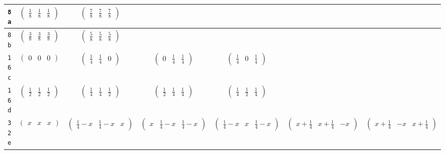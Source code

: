 \documentclass[fleqn,9pt,landscape]{jsarticle}
\begin{document}
\begin{center}
\begin{longtable}{ccccccc}
{\tt 8a} & $ \begin{pmatrix} \frac{1}{8} & \frac{1}{8} & \frac{1}{8} \end{pmatrix} $ & $ \begin{pmatrix} \frac{7}{8} & \frac{7}{8} & \frac{7}{8} \end{pmatrix} $ & $  $ & $  $ & $  $ & $  $ \\ \hline
{\tt 8b} & $ \begin{pmatrix} \frac{3}{8} & \frac{3}{8} & \frac{3}{8} \end{pmatrix} $ & $ \begin{pmatrix} \frac{5}{8} & \frac{5}{8} & \frac{5}{8} \end{pmatrix} $ & $  $ & $  $ & $  $ & $  $ \\ \hline
{\tt 16c} & $ \begin{pmatrix} 0 & 0 & 0 \end{pmatrix} $ & $ \begin{pmatrix} \frac{1}{4} & \frac{1}{4} & 0 \end{pmatrix} $ & $ \begin{pmatrix} 0 & \frac{1}{4} & \frac{1}{4} \end{pmatrix} $ & $ \begin{pmatrix} \frac{1}{4} & 0 & \frac{1}{4} \end{pmatrix} $ & $  $ & $  $ \\ \hline
{\tt 16d} & $ \begin{pmatrix} \frac{1}{2} & \frac{1}{2} & \frac{1}{2} \end{pmatrix} $ & $ \begin{pmatrix} \frac{1}{4} & \frac{1}{4} & \frac{1}{2} \end{pmatrix} $ & $ \begin{pmatrix} \frac{1}{2} & \frac{1}{4} & \frac{1}{4} \end{pmatrix} $ & $ \begin{pmatrix} \frac{1}{4} & \frac{1}{2} & \frac{1}{4} \end{pmatrix} $ & $  $ & $  $ \\ \hline
{\tt 32e} & $ \begin{pmatrix} x & x & x \end{pmatrix} $ & $ \begin{pmatrix} \frac{1}{4} - x & \frac{1}{4} - x & x \end{pmatrix} $ & $ \begin{pmatrix} x & \frac{1}{4} - x & \frac{1}{4} - x \end{pmatrix} $ & $ \begin{pmatrix} \frac{1}{4} - x & x & \frac{1}{4} - x \end{pmatrix} $ & $ \begin{pmatrix} x + \frac{1}{4} & x + \frac{1}{4} & - x \end{pmatrix} $ & $ \begin{pmatrix} x + \frac{1}{4} & - x & x + \frac{1}{4} \end{pmatrix} $ \\

\end{longtable}
\end{center}
\end{document}
